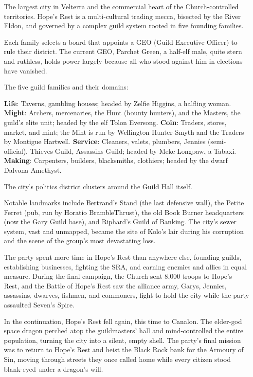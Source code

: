 \noindent

The largest city in Velterra and the commercial heart of the Church-controlled territories.  Hope's Rest is a multi-cultural trading mecca, bisected by the River Eldon, and governed by a complex guild system rooted in five founding families.

Each family selects a board that appoints a GEO (Guild Executive Officer) to rule their district.  The current GEO, Parchet Green, a half-elf male, quite stern and ruthless, holds power largely because all who stood against him in elections have vanished.

The five guild families and their domains:

\textbf{Life}: Taverns, gambling houses; headed by Zelfie Higgins, a halfling woman. \textbf{Might}: Archers, mercenaries, the Hunt (bounty hunters), and the Masters, the guild's elite unit; headed by the elf Tolon Eversong. \textbf{Coin}: Traders, stores, market, and mint; the Mint is run by Wellington Hunter-Smyth and the Traders by Montigue Hartwell. \textbf{Service}: Cleaners, valets, plumbers, Jennies (semi-official), Thieves Guild, Assassins Guild; headed by Meke Longpaw, a Tabaxi. \textbf{Making}: Carpenters, builders, blacksmiths, clothiers; headed by the dwarf Dalvona Amethyst.

The city's politics district clusters around the Guild Hall itself.

Notable landmarks include Bertrand's Stand (the last defensive wall), the Petite Ferret (pub, run by Horatio BrambleThrust), the old Book Burner headquarters (now the Gary Guild base), and Riphard's Guild of Banking.  The city's sewer system, vast and unmapped, became the site of Kolo's lair during his corruption and the scene of the group's most devastating loss.

The party spent more time in Hope's Rest than anywhere else, founding guilds, establishing businesses, fighting the SRA, and earning enemies and allies in equal measure.  During the final campaign, the Church sent 8,000 troops to Hope's Rest, and the Battle of Hope's Rest saw the alliance army, Garys, Jennies, assassins, dwarves, fishmen, and commoners, fight to hold the city while the party assaulted Seven's Spire.

In the continuation, Hope's Rest fell again, this time to Canalon.  The elder-god space dragon perched atop the guildmasters' hall and mind-controlled the entire population, turning the city into a silent, empty shell.  The party's final mission was to return to Hope's Rest and heist the Black Rock bank for the Armoury of Sin, moving through streets they once called home while every citizen stood blank-eyed under a dragon's will.

